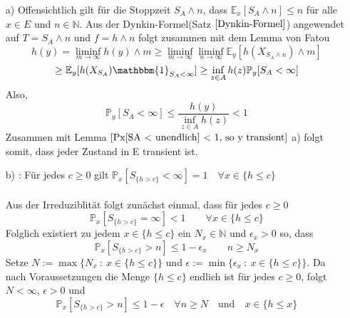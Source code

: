 \begin{itemize}
\item[a)] Offensichtlich gilt für die Stoppzeit $S_{A} \wedge n$, dass $\mathbb{E}_{x}[S_{A} \wedge n] \leq n$ für alle $x \in E$ und $n \in \mathbb{N}$. Aus der Dynkin-Formel(Satz $\ref{Dynkin-Formel}$) angewendet auf $T = S_{A} \wedge n$ und $f = h \wedge n$ folgt zusammen mit dem Lemma von Fatou
\begin{equation*}
h(y) = \liminf_{m \to \infty} h(y) \wedge m \geq \liminf_{m \to \infty}
\liminf_{n \to \infty} \mathbb{E}_{y}[h(X_{S_{A} \wedge n}) \wedge m] 
\end{equation*}
\begin{equation*}
\geq \mathbb{E}_{y}[h(X_{S_{A}})\mathbbm{1}_{S_{A} < \infty}] \geq \inf_{z \in A} h(z) \mathbb{P}_{y}[S_{A} < \infty]
\end{equation*}
Also,
\begin{equation*}
\mathbb{P}_{y}[S_{A}< \infty] \leq \dfrac{h(y)}{\inf_{z \in A} h(z)} < 1
\end{equation*}
Zusammen mit Lemma $\ref{Px[SA < unendlich] < 1, so y transient}$ a) folgt somit, dass jeder Zustand in E transient ist.
\item[b)] : Für jedes $c \geq 0$ gilt $\mathbb{P}_{x}[S_{\lbrace h > c \rbrace} < \infty] = 1 \quad \forall x \in \lbrace h \leq c \rbrace$
\\
\\
Aus der Irreduziblität folgt zunächst einmal, dass für jedes $c \geq 0$
\begin{equation*}
\mathbb{P}_{x}[S_{\lbrace h > c \rbrace} = \infty] < 1 \qquad \forall x \in \lbrace h \leq c \rbrace
\end{equation*}
Folglich existiert zu jedem $x \in \lbrace h \leq c \rbrace$ ein $N_{x} \in \mathbb{N}$ und $\epsilon_{x} > 0$ so, dass
\begin{equation*}
\mathbb{P}_{x}[S_{\lbrace h > c \rbrace} > n] \leq 1 - \epsilon_{x} \qquad n \geq N_{x}
\end{equation*}
Setze $N := \max {\lbrace N_{x} \: : \: x \in {\lbrace h \leq c \rbrace}  \rbrace}$ und $\epsilon := \min \lbrace \epsilon_{x} \: : \: x \in \lbrace h \leq c \rbrace \rbrace$. Da nach Voraussetzungen die Menge $\lbrace h \leq c \rbrace$ endlich ist für jedes $c \geq 0$, folgt $N < \infty$, $\epsilon > 0$ und
\begin{equation*}
\mathbb{P}_{x}[S_{\lbrace h > c \rbrace} > n] \leq 1 - \epsilon \quad \forall n \geq N \quad \mathrm{und} \quad x \in {\lbrace h \leq x \rbrace}

\end{equation*}
\end{itemize}
